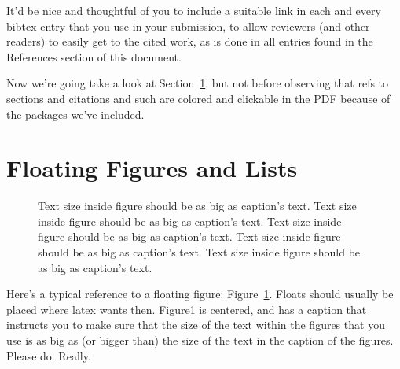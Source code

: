 It'd be nice and thoughtful of you to include a suitable link in each
and every bibtex entry that you use in your submission, to allow
reviewers (and other readers) to easily get to the cited work, as is
done in all entries found in the References section of this document.

Now we're going take a look at Section~\ref{sec:figs}, but not before
observing that refs to sections and citations and such are colored and
clickable in the PDF because of the packages we've included.






\section{Floating Figures and Lists}
\label{sec:figs}


\begin{figure}
\begin{center}
\end{center}
\caption{\label{fig:vectors} Text size inside figure should be as big as
  caption's text. Text size inside figure should be as big as
  caption's text. Text size inside figure should be as big as
  caption's text. Text size inside figure should be as big as
  caption's text. Text size inside figure should be as big as
  caption's text. }
\end{figure}


Here's a typical reference to a floating figure:
Figure~\ref{fig:vectors}. Floats should usually be placed where latex
wants then. Figure\ref{fig:vectors} is centered, and has a caption
that instructs you to make sure that the size of the text within the
figures that you use is as big as (or bigger than) the size of the
text in the caption of the figures. Please do. Really.

